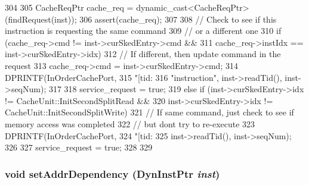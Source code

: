 \begin{DoxyCode}
304 {
305     CacheReqPtr cache_req = dynamic_cast<CacheReqPtr>(findRequest(inst));
306     assert(cache_req);
307 
308     // Check to see if this instruction is requesting the same command
309     // or a different one
310     if (cache_req->cmd != inst->curSkedEntry->cmd &&
311         cache_req->instIdx == inst->curSkedEntry->idx) {
312         // If different, then update command in the request
313         cache_req->cmd = inst->curSkedEntry->cmd;
314         DPRINTF(InOrderCachePort,
315                 "[tid:%
316                 "instruction\n", inst->readTid(), inst->seqNum);
317 
318         service_request = true;
319     } else if (inst->curSkedEntry->idx != CacheUnit::InitSecondSplitRead &&
320                inst->curSkedEntry->idx != CacheUnit::InitSecondSplitWrite) {
321         // If same command, just check to see if memory access was completed
322         // but dont try to re-execute
323         DPRINTF(InOrderCachePort,
324                 "[tid:%
325                 inst->readTid(), inst->seqNum);
326 
327         service_request = true;
328     }
329 }
\end{DoxyCode}
\hypertarget{classCacheUnit_a4244e66bc15f13c2dbec20ca5fcea3d4}{
\subsubsection[{setAddrDependency}]{\setlength{\rightskip}{0pt plus 5cm}void setAddrDependency ({\bf DynInstPtr} {\em inst})}}
\label{classCacheUnit_a4244e66bc15f13c2dbec20ca5fcea3d4}



